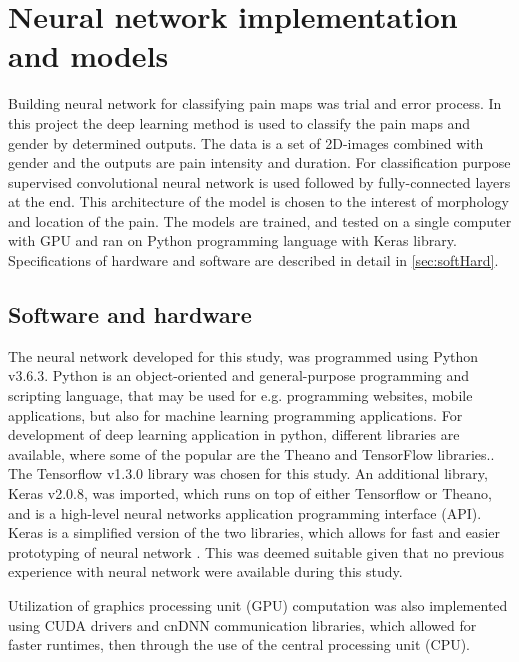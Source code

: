 \section{Neural network implementation and models}
Building neural network for classifying pain maps was trial and error process.
In this project the deep learning method is used to classify the pain maps and gender by determined outputs. The data is a set of 2D-images combined with gender and the outputs are pain intensity and duration. For classification purpose supervised convolutional neural network is used followed by fully-connected layers at the end. This architecture of the model is chosen to the interest of morphology and location of the pain. The models are trained, and tested on a single computer with GPU and ran on Python programming language with Keras library. Specifications of hardware and software are described in detail in \autoref{sec:softHard}.

\subsection{Software and hardware}\label{sec:softHard}
The neural network developed for this study, was programmed using Python v3.6.3. Python is an object-oriented and general-purpose programming and scripting language, that may be used for e.g. programming websites, mobile applications, but also for machine learning programming applications.
For development of deep learning application in python, different libraries are available, where some of the popular are the Theano and TensorFlow libraries.\citep{Swamynathan2017}. The Tensorflow v1.3.0 library was chosen for this study. %
An additional library, Keras v2.0.8, was imported, which runs on top of either Tensorflow or Theano, and is a high-level neural networks application programming interface (API).   
Keras is a simplified version of the two libraries, which allows for fast and easier prototyping of neural network \citep{Chollet2015}. This was deemed suitable given that no previous experience with neural network were available during this study.  

Utilization of graphics processing unit (GPU) computation was also implemented using CUDA drivers and cnDNN communication libraries, which allowed for faster runtimes, then through the use of the central processing unit (CPU).
 
